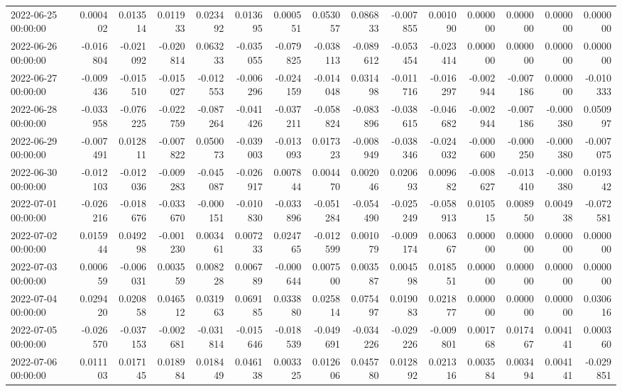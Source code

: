 \begin{tabular}{lrrrrrrrrrrrrrr}
2022-06-25 00:00:00 & 0.000402 & 0.013514 & 0.011933 & 0.023492 & 0.013695 & 0.000551 & 0.053057 & 0.086833 & -0.007855 & 0.001090 & 0.000000 & 0.000000 & 0.000000 & 0.000000 \\
2022-06-26 00:00:00 & -0.016804 & -0.021092 & -0.020814 & 0.063233 & -0.035055 & -0.079825 & -0.038113 & -0.089612 & -0.053454 & -0.023414 & 0.000000 & 0.000000 & 0.000000 & 0.000000 \\
2022-06-27 00:00:00 & -0.009436 & -0.015510 & -0.015027 & -0.012553 & -0.006296 & -0.024159 & -0.014048 & 0.031498 & -0.011716 & -0.016297 & -0.002944 & -0.007186 & 0.000000 & -0.010333 \\
2022-06-28 00:00:00 & -0.033958 & -0.076225 & -0.022759 & -0.087264 & -0.041426 & -0.037211 & -0.058824 & -0.083896 & -0.038615 & -0.046682 & -0.002944 & -0.007186 & -0.000380 & 0.050997 \\
2022-06-29 00:00:00 & -0.007491 & 0.012811 & -0.007822 & 0.050073 & -0.039003 & -0.013093 & 0.017323 & -0.008949 & -0.038346 & -0.024032 & -0.000600 & -0.000250 & -0.000380 & -0.007075 \\
2022-06-30 00:00:00 & -0.012103 & -0.012036 & -0.009283 & -0.045087 & -0.026917 & 0.007844 & 0.004470 & 0.002046 & 0.020693 & 0.009682 & -0.008627 & -0.013410 & -0.000380 & 0.019342 \\
2022-07-01 00:00:00 & -0.026216 & -0.018676 & -0.033670 & -0.000151 & -0.010830 & -0.033896 & -0.051284 & -0.054490 & -0.025249 & -0.058913 & 0.010515 & 0.008950 & 0.004938 & -0.072581 \\
2022-07-02 00:00:00 & 0.015944 & 0.049298 & -0.001230 & 0.003461 & 0.007233 & 0.024765 & -0.012599 & 0.001079 & -0.009174 & 0.006367 & 0.000000 & 0.000000 & 0.000000 & 0.000000 \\
2022-07-03 00:00:00 & 0.000659 & -0.006031 & 0.003559 & 0.008228 & 0.006789 & -0.000644 & 0.007500 & 0.003587 & 0.004598 & 0.018551 & 0.000000 & 0.000000 & 0.000000 & 0.000000 \\
2022-07-04 00:00:00 & 0.029420 & 0.020858 & 0.046512 & 0.031963 & 0.069185 & 0.033880 & 0.025814 & 0.075497 & 0.019083 & 0.021877 & 0.000000 & 0.000000 & 0.000000 & 0.030616 \\
2022-07-05 00:00:00 & -0.026570 & -0.037153 & -0.002681 & -0.031814 & -0.015646 & -0.018539 & -0.049691 & -0.034226 & -0.029226 & -0.009801 & 0.001768 & 0.017467 & 0.004141 & 0.000360 \\
2022-07-06 00:00:00 & 0.011103 & 0.017145 & 0.018984 & 0.018449 & 0.046138 & 0.003325 & 0.012606 & 0.045780 & 0.012892 & 0.021316 & 0.003584 & 0.003494 & 0.004141 & -0.029851 \\

\end{tabular}
